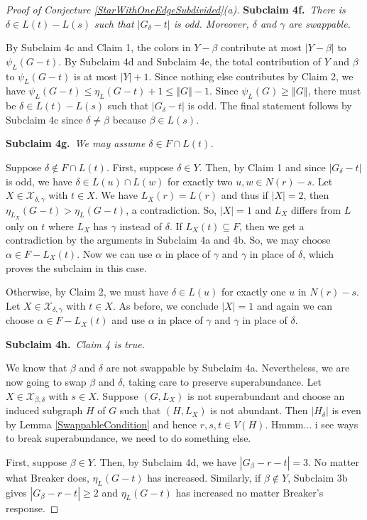 \documentclass[12pt]{article}
\theoremstyle{plain}
\theoremstyle{definition}
\theoremstyle{remark}
\newcommand{\fancy}[1]{\mathcal{#1}}
\newcommand{\card}[1]{\left|#1\right|}
\newcommand{\size}[1]{\left\Vert#1\right\Vert}
\def\X{\fancy{X}}
\newcommand{\subclaim}[2]{{\bf Subclaim #1.}~{\it #2}~~}
\begin{document}
\begin{proof} [Proof of Conjecture \ref{StarWithOneEdgeSubdivided}(a)]
	\subclaim{4f}{There is $\delta \in L(t) - L(s)$ such that $\card{G_\delta - t}$ is odd.  Moreover, $\delta$ and $\gamma$ are swappable.}
	
	By Subclaim 4c and Claim 1, the colors in $Y - \beta$ contribute at most $|Y - \beta|$ to $\psi_L(G - t)$.  By Subclaim 4d and Subclaim 4e, the total contribution of $Y$ and $\beta$ to $\psi_L(G - t)$ is at most $\card{Y} + 1$.  Since nothing else contributes by Claim 2, we have $\psi_L(G - t) \le \eta_L(G - t) + 1 \le \size{G} - 1$.  Since $\psi_L(G) \ge \size{G}$, there must be $\delta \in L(t) - L(s)$ such that $\card{G_\delta - t}$ is odd.  The final statement follows by Subclaim 4c since $\delta \ne \beta$ because $\beta \in L(s)$.
	
	\subclaim{4g}{We may assume $\delta \in F \cap L(t)$.}
	
	Suppose  $\delta \not \in F \cap L(t)$.  First, suppose $\delta \in Y$. Then, by Claim 1 and since $\card{G_\delta - t}$ is odd, we have $\delta \in L(u) \cap L(w)$ for exactly two $u,w \in N(r) - s$.   Let $X \in \X_{\delta,\gamma}$ with $t \in X$.  We have $L_X(r) = L(r)$ and thus if $|X| = 2$, then $\eta_{L_X}(G - t) > \eta_L(G - t)$, a contradiction.  So, $|X| = 1$ and $L_X$ differs from $L$ only on $t$ where $L_X$ has $\gamma$ instead of $\delta$. If $L_X(t) \subseteq F$, then we get a contradiction by the arguments in Subclaim 4a and 4b.  So, we may choose $\alpha \in F - L_X(t)$. Now we can use $\alpha$ in place of $\gamma$ and $\gamma$ in place of $\delta$, which proves the subclaim in this case.
	
	Otherwise, by Claim 2, we must have $\delta \in L(u)$ for exactly one $u$ in $N(r) - s$.  Let $X \in \X_{\delta,\gamma}$ with $t \in X$. As before, we conclude $|X| = 1$ and again we can choose $\alpha \in F - L_X(t)$ and use $\alpha$ in place of $\gamma$ and $\gamma$ in place of $\delta$.
	
	\subclaim{4h}{Claim 4 is true.}
	
	We know that $\beta$ and $\delta$ are not swappable by Subclaim 4a.  Nevertheless, we are now going to swap $\beta$ and $\delta$, taking care to preserve superabundance.  Let $X \in \X_{\beta,\delta}$ with $s \in X$.   Suppose $(G, L_X)$ is not superabundant and choose an induced subgraph $H$ of $G$ such that $(H, L_X)$ is not abundant.  Then $\card{H_\delta}$ is even by Lemma \ref{SwappableCondition} and hence $r,s,t \in V(H)$.  Hmmm... i see ways to break superabundance, we need to do something else.

	
	First, suppose $\beta \in Y$.  Then, by Subclaim 4d, we have $\card{G_\beta - r - t} = 3$.  No matter what Breaker does, $\eta_L(G-t)$ has increased.  Similarly, if $\beta \not \in Y$, Subclaim 3b gives $\card{G_\beta - r - t} \ge 2$ and $\eta_L(G-t)$ has increased no matter Breaker's response.


\end{proof}
\end{document}
